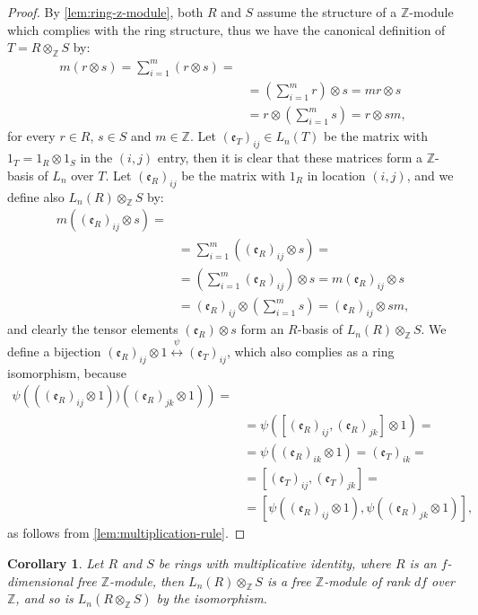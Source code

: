 \documentclass{article}
\newtheorem{corollary}[theorem]{Corollary}
\newcommand{\e}{\mathfrak{e}}
\begin{document}
\begin{proof}
By \ref{lem:ring-z-module}, both $R$ and $S$ assume the structure of a $\mathbb{Z}$-module which complies with the ring structure, thus we have the canonical definition of $T=R\otimes_\mathbb{Z}S$ by:
\begin{align*}
m(r\otimes{s})=\sum_{i=1}^m(r\otimes{s})=\\
&=\left(\sum_{i=1}^mr\right)\otimes{s}=mr\otimes{s}\\
&=r\otimes\left(\sum_{i=1}^ms\right)=r\otimes{s}m,
\end{align*}
for every $r\in{R}$, $s\in{S}$ and $m\in\mathbb{Z}$. 
Let $(\e_T)_{ij}\in{L}_n(T)$ be the matrix with $1_T=1_R\otimes1_S$ in the $(i,j)$ entry, then it is clear that these matrices form a $\mathbb{Z}$-basis of $L_n$ over $T$.
Let $(\e_R)_{ij}$ be the matrix with $1_R$ in location $(i,j)$, and we define also $L_n(R)\otimes_\mathbb{Z}S$ by:
\begin{align*}
m((\e_R)_{ij}\otimes{s})=\\
&=\sum_{i=1}^m((\e_R)_{ij}\otimes{s})=\\
&=\left(\sum_{i=1}^m(\e_R)_{ij}\right)\otimes{s}=m(\e_R)_{ij}\otimes{s}\\
&=(\e_R)_{ij}\otimes\left(\sum_{i=1}^ms\right)=(\e_R)_{ij}\otimes{s}m,
\end{align*}
and clearly the tensor elements $(\e_R)\otimes{s}$ form an $R$-basis of $L_n(R)\otimes_\mathbb{Z}S$.
We define a bijection $(\e_R)_{ij}\otimes1\overset{\psi}{\longleftrightarrow}(\e_T)_{ij}$, which also complies as a ring isomorphism, because 
\begin{align*}
\psi\left(((\e_R)_{ij}\otimes1))((\e_R)_{jk}\otimes1)\right)=\\
&=\psi([(\e_R)_{ij},(\e_R)_{jk}]\otimes1)=\\
&=\psi((\e_R)_{ik}\otimes1)=(\e_T)_{ik}=\\
&=[(\e_T)_{ij},(\e_T)_{jk}]=\\
&=[\psi((\e_R)_{ij}\otimes1),\psi((\e_R)_{jk}\otimes1)],
\end{align*}
as follows from \ref{lem:multiplication-rule}.
\end{proof}
\begin{corollary}
Let $R$ and $S$ be rings with multiplicative identity, where $R$ is an $f$-dimensional free $\mathbb{Z}$-module, then $L_n(R)\otimes_\mathbb{Z}S$ is a free $\mathbb{Z}$-module of rank $df$ over $\mathbb{Z}$, and so is $L_n(R\otimes_\mathbb{Z}S)$ by the isomorphism.
\end{corollary}
\end{document}
